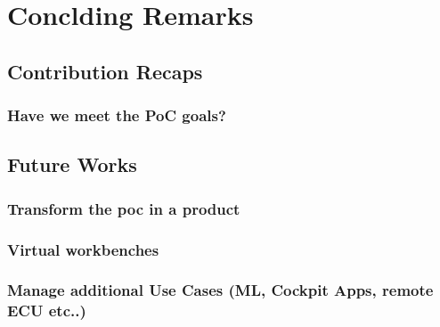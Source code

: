 \chapter{Conclding Remarks} \label{ch:concldingRemarks}

\section{Contribution Recaps}
\subsection{Have we meet the PoC goals?}

\section{Future Works}
\subsection{Transform the poc in a product}
\subsection{Virtual workbenches}
\subsection{Manage additional Use Cases (ML, Cockpit Apps, remote ECU etc..)}